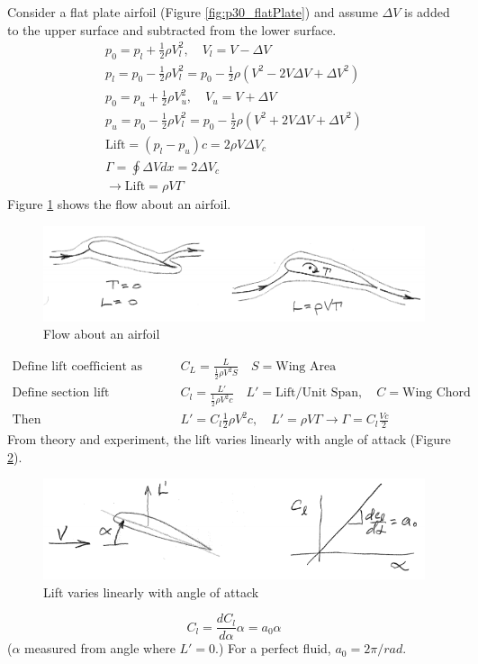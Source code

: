 \documentclass[draft=false, titlepage]{article}
\begin{document}
Consider a flat plate airfoil (Figure \ref{fig:p30_flatPlate}) and assume $\Delta V$ is added to the upper surface and subtracted from the lower surface.
\begin{gather*}
p_0 = p_l + \frac{1}{2} \rho V_l^2,\quad V_l = V - \Delta V\\
p_l = p_0 - \frac{1}{2} \rho V_l^2 = p_0 - \frac{1}{2}\rho (V^2 - 2V\Delta V + \Delta V^2)\\
p_0 = p_u + \frac{1}{2} \rho V_u^2,\quad V_u = V + \Delta V\\
p_u = p_0 - \frac{1}{2}\rho V_l^2 = p_0 - \frac{1}{2}\rho (V^2 + 2V\Delta V + \Delta V^2)\\
\text{Lift} = (p_l-p_u)c = 2\rho V\Delta V_c\\
\Gamma = \oint \Delta V dx = 2\Delta V_c\\
\rightarrow \text{Lift} = \rho V\Gamma
\end{gather*}
Figure \ref{fig:p30_flowOnAirfoil} shows the flow about an airfoil.
\begin{figure}[ht]
	\centering
	\includegraphics[width=0.8\linewidth]{Figures/p30_flowOnAirfoil.PNG}
	\caption{Flow about an airfoil}
	\label{fig:p30_flowOnAirfoil}
\end{figure}

\begin{align*}
\text{Define lift coefficient as} &\quad
C_L = \frac{L}{\frac{1}{2}\rho V^2S}\quad S = \text{Wing Area}\\
\text{Define section lift coefficient as} &\quad
C_l = \frac{L'}{\frac{1}{2}\rho V^2 c}\quad L' = \text{Lift/Unit Span}, \quad C = \text{Wing Chord}\\
\text{Then} &\quad L' = C_l \frac{1}{2}\rho V^2 c, \quad L' = \rho V\Gamma \rightarrow \Gamma = C_l \frac{Vc}{2}
\end{align*}
From theory and experiment, the lift varies linearly with angle of attack (Figure \ref{fig:p31_liftVsAOA}).
\begin{figure}[ht]
	\centering
	\includegraphics[width=0.8\linewidth]{Figures/p31_liftVsAOA.PNG}
	\caption{Lift varies linearly with angle of attack}
	\label{fig:p31_liftVsAOA}
\end{figure}
\begin{equation}
C_l = \frac{dC_l}{d\alpha} \alpha = a_0 \alpha
\end{equation}
($\alpha$ measured from angle where $L' = 0$.) For a perfect fluid, $a_0 = 2\pi/rad$.
\end{document}
